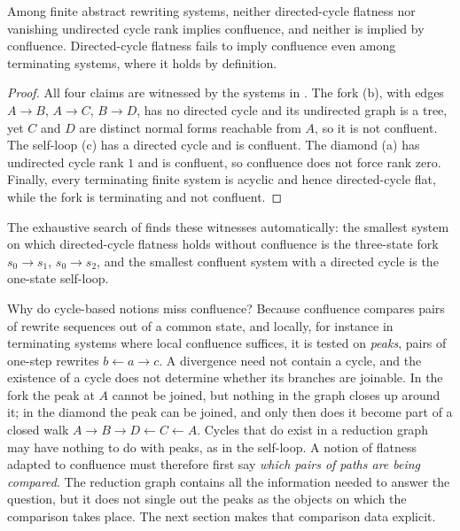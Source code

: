 \begin{proposition}
\label{prop:bare-graph-not-diagnostic}
Among finite abstract rewriting systems, neither directed-cycle flatness nor vanishing undirected cycle rank implies confluence, and neither is implied by confluence. Directed-cycle flatness fails to imply confluence even among terminating systems, where it holds by definition.
\end{proposition}

\begin{proof}
All four claims are witnessed by the systems in . The fork (b), with edges $A \to B$, $A \to C$, $B \to D$, has no directed cycle and its undirected graph is a tree, yet $C$ and $D$ are distinct normal forms reachable from $A$, so it is not confluent. The self-loop (c) has a directed cycle and is confluent. The diamond (a) has undirected cycle rank $1$ and is confluent, so confluence does not force rank zero. Finally, every terminating finite system is acyclic and hence directed-cycle flat, while the fork is terminating and not confluent.
\end{proof}

The exhaustive search of  finds these witnesses automatically: the smallest system on which directed-cycle flatness holds without confluence is the three-state fork $s_0 \to s_1$, $s_0 \to s_2$, and the smallest confluent system with a directed cycle is the one-state self-loop.

Why do cycle-based notions miss confluence? Because confluence compares pairs of rewrite sequences out of a common state, and locally, for instance in terminating systems where local confluence suffices, it is tested on \emph{peaks}, pairs of one-step rewrites $b \leftarrow a \to c$. A divergence need not contain a cycle, and the existence of a cycle does not determine whether its branches are joinable. In the fork the peak at $A$ cannot be joined, but nothing in the graph closes up around it; in the diamond the peak can be joined, and only then does it become part of a closed walk $A \to B \to D \leftarrow C \leftarrow A$. Cycles that do exist in a reduction graph may have nothing to do with peaks, as in the self-loop. A notion of flatness adapted to confluence must therefore first say \emph{which pairs of paths are being compared}. The reduction graph contains all the information needed to answer the question, but it does not single out the peaks as the objects on which the comparison takes place. The next section makes that comparison data explicit.
